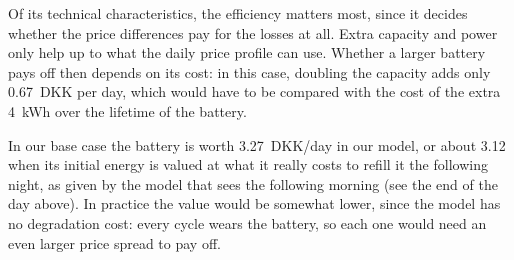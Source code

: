 Of its technical characteristics, the efficiency matters most, since it decides whether the price
differences pay for the losses at all. Extra capacity and power only help up to what the daily
price profile can use. Whether a larger battery pays off then depends on its cost: in this case,
doubling the capacity adds only 0.67~DKK per day, which would have to be compared with the cost of
the extra 4~kWh over the lifetime of the battery.

In our base case the battery is worth 3.27~DKK/day in our model, or about 3.12 when its initial
energy is valued at what it really costs to refill it the following night, as given by the model
that sees the following morning (see the end of the day above). In practice the value would be somewhat lower, since the model
has no degradation cost: every cycle wears the battery, so each one would need an even larger
price spread to pay off.
